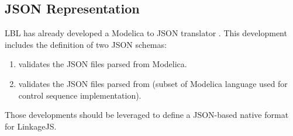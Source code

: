 \documentclass[letterpaper,10pt, openany,english]{sphinxmanual}
\begin{document}
\subsection{JSON Representation}
\label{\detokenize{requirements:json-representation}}
LBL has already developed a Modelica to JSON translator . This development includes the definition of two JSON schemas:
\begin{enumerate}
%
\item {} 
 validates the JSON files parsed from Modelica.

\item {} 
 validates the JSON files parsed from  (subset of Modelica language used for control sequence implementation).

\end{enumerate}

Those developments should be leveraged to define a JSON-based native format for LinkageJS.
\end{document}

